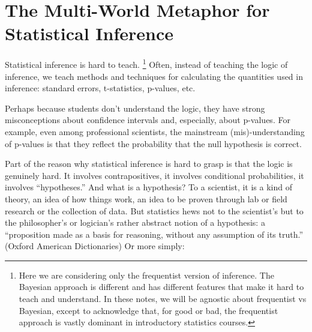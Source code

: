 \section{The Multi-World Metaphor for Statistical Inference}

Statistical inference is hard to teach.%
\footnote{Here we are considering only the
  frequentist version of inference.  The Bayesian approach is
  different and has different features that make it hard to teach and
  understand.  In these notes, we will be agnostic about frequentist
  vs Bayesian, except to acknowledge that, for good or bad, the
  frequentist approach is vastly dominant in introductory statistics courses.}
Often, instead of teaching
the logic of inference, we teach methods and techniques for
calculating the quantities used in inference: standard errors,
t-statistics, p-values, etc.  

Perhaps because students don't understand the logic, they have strong
misconceptions about confidence intervals and, especially, about
p-values.  For example, even among professional scientists, the
mainstream (mis)-understanding of p-values is that they reflect the
probability that the null hypothesis is correct.

Part of the reason why statistical inference is hard to grasp is that
the logic is genuinely hard.  It involves contrapositives, it
involves conditional probabilities, it involves ``hypotheses.''
And what is a hypothesis?  To a scientist, it is a kind of theory, an idea of how
things work, an idea to be proven through lab or field research or the
collection of data.  
%
But statistics hews not to the scientist's but to
the philosopher's or logician's rather abstract notion 
of a hypothesis: a ``proposition made as a basis for reasoning, without any
assumption of its truth.''  (Oxford American Dictionaries)  Or more simply:

